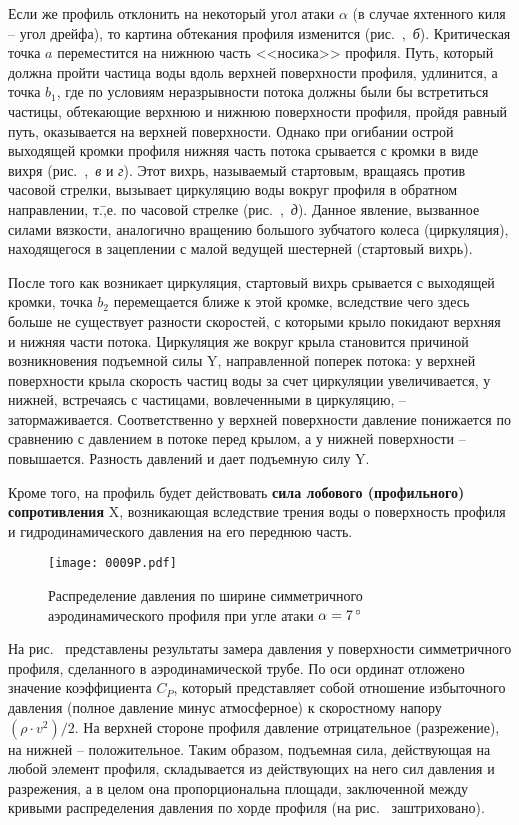 Если же профиль отклонить на некоторый угол атаки $\alpha$ (в случае яхтенного киля \--- угол дрейфа), то картина обтекания профиля изменится (рис.~,~\textit{б}). Критическая точка $a$ переместится на нижнюю часть <<носика>> профиля. Путь, который должна пройти частица воды вдоль верхней поверхности профиля, удлинится, а точка $b_1$, где по условиям неразрывности потока должны были бы встретиться частицы, обтекающие верхнюю и нижнюю поверхности профиля, пройдя равный путь, оказывается на верхней поверхности. Однако при огибании острой выходящей кромки профиля нижняя часть потока срывается с кромки в виде вихря (рис.~,~\textit{в} и \textit{г}). Этот вихрь, называемый стартовым, вращаясь против часовой стрелки, вызывает циркуляцию воды вокруг профиля в обратном направлении, т.\=,е. по часовой стрелке (рис.~,~\textit{д}). Данное явление, вызванное силами вязкости, аналогично вращению большого зубчатого колеса (циркуляция), находящегося в зацеплении с малой ведущей шестерней (стартовый вихрь). 

После того как возникает циркуляция, стартовый вихрь срывается с выходящей кромки, точка $b_2$ перемещается ближе к этой кромке, вследствие чего здесь больше не существует разности скоростей, с которыми крыло покидают верхняя и нижняя части потока. Циркуляция же вокруг крыла становится причиной возникновения подъемной силы \ve Y, направленной поперек потока: у верхней поверхности крыла скорость частиц воды за счет циркуляции увеличивается, у нижней, встречаясь с частицами, вовлеченными в циркуляцию, \--- затормаживается. Соответственно у верхней поверхности давление понижается по сравнению с давлением в потоке перед крылом, а у нижней поверхности \--- повышается. Разность давлений и дает подъемную силу \ve Y. 

Кроме того, на профиль будет действовать \textbf{сила лобового (профильного) сопротивления} \ve X, возникающая вследствие трения воды о поверхность профиля и гидродинамического давления на его переднюю часть.

\begin{figure}[htb]
  \centering
  \texttt{[image: 0009P.pdf]}
  \caption{Распределение давления по ширине симметричного аэродинамического профиля при угле атаки $\alpha = 7\,^\circ$}
  \label{fig:9}
\end{figure}

На рис.~ представлены результаты замера давления у поверхности симметричного профиля, сделанного в аэродинамической трубе. По оси ординат отложено значение коэффициента $C_P$, который представляет собой отношение избыточного давления (полное давление минус атмосферное) к скоростному напору $(\rho \cdot v^2) / 2$. На верхней стороне профиля давление отрицательное (разрежение), на нижней \--- положительное. Таким образом, подъемная сила, действующая на любой элемент профиля, складывается из действующих на него сил давления и разрежения, а в целом она пропорциональна площади, заключенной между кривыми распределения давления по хорде профиля (на рис.~ заштриховано).

